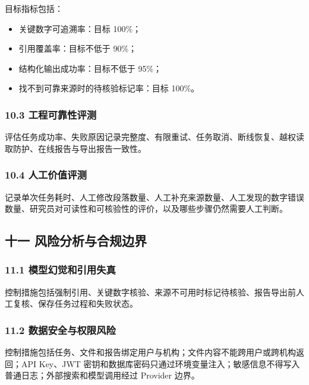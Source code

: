 \documentclass[a4paper,12pt,fontset=none]{ctexart}
\begin{document}
目标指标包括：

\begin{itemize}
\tightlist
\item
  关键数字可追溯率：目标 100\%；
\item
  引用覆盖率：目标不低于 90\%；
\item
  结构化输出成功率：目标不低于 95\%；
\item
  找不到可靠来源时的待核验标记率：目标 100\%。
\end{itemize}

\subsubsection{10.3
工程可靠性评测}\label{ux5de5ux7a0bux53efux9760ux6027ux8bc4ux6d4b}

评估任务成功率、失败原因记录完整度、有限重试、任务取消、断线恢复、越权读取防护、在线报告与导出报告一致性。

\subsubsection{10.4
人工价值评测}\label{ux4ebaux5de5ux4ef7ux503cux8bc4ux6d4b}

记录单次任务耗时、人工修改段落数量、人工补充来源数量、人工发现的数字错误数量、研究员对可读性和可核验性的评价，以及哪些步骤仍然需要人工判断。

\subsection{十一
风险分析与合规边界}\label{ux5341ux4e00-ux98ceux9669ux5206ux6790ux4e0eux5408ux89c4ux8fb9ux754c}

\subsubsection{11.1
模型幻觉和引用失真}\label{ux6a21ux578bux5e7bux89c9ux548cux5f15ux7528ux5931ux771f}

控制措施包括强制引用、关键数字核验、来源不可用时标记待核验、报告导出前人工复核、保存任务过程和失败状态。

\subsubsection{11.2
数据安全与权限风险}\label{ux6570ux636eux5b89ux5168ux4e0eux6743ux9650ux98ceux9669}

控制措施包括任务、文件和报告绑定用户与机构；文件内容不能跨用户或跨机构返回；API
Key、JWT
密钥和数据库密码只通过环境变量注入；敏感信息不得写入普通日志；外部搜索和模型调用经过
Provider 边界。
\end{document}
